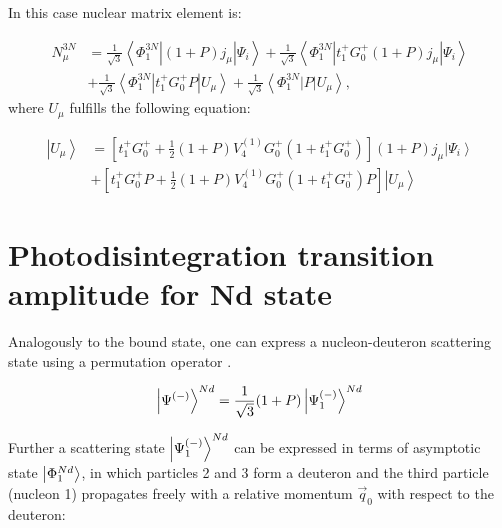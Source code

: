    In this case nuclear matrix element is:

    \begin{equation}
        \begin{aligned}
            N_\mu^{3 N} & =\frac{1}{\sqrt{3}}\left\langle\Phi_1^{3 N}\left|(1+P) j_\mu\right| \Psi_i\right\rangle+\frac{1}{\sqrt{3}}\left\langle\Phi_1^{3 N}\left|t_1^{+} G_0^{+}(1+P) j_\mu\right| \Psi_i\right\rangle \\
            & +\frac{1}{\sqrt{3}}\left\langle\Phi_1^{3 N}\left|t_1^{+} G_0^{+} P\right| U_\mu\right\rangle+\frac{1}{\sqrt{3}}\left\langle\Phi_1^{3 N}|P| U_\mu\right\rangle,
            \end{aligned}
        \label{3n_matrix}
    \end{equation}
    where $ U_\mu$ fulfills the
    following equation:

    \begin{equation}
        \begin{aligned}
            \left|U_\mu\right\rangle & =\left[t_1^{+} G_0^{+}+\frac{1}{2}(1+P) V_4^{(1)} G_0^{+}\left(1+t_1^{+} G_0^{+}\right)\right](1+P) j_\mu\left|\Psi_i\right\rangle \\
            & +\left[t_1^{+} G_0^{+} P+\frac{1}{2}(1+P) V_4^{(1)} G_0^{+}\left(1+t_1^{+} G_0^{+}\right) P\right]\left|U_\mu\right\rangle
            \end{aligned}
        \label{u_mu}
    \end{equation}



\section{Photodisintegration transition amplitude for Nd state}
\label{nd_state}

    Analogously to the bound state, one can express a nucleon-deuteron
    scattering state
    using a permutation operator .

    \begin{equation}
        \ket{\Psi^{(-)}}^{Nd} = \frac{1}{\sqrt{3}}(1+P)\ket{\Psi^{(-)}_1}^{Nd}    
    \end{equation}

    Further a scattering state $\ket{\Psi^{(-)}_1}^{Nd}$ can be expressed
    in terms of asymptotic state $\ket{\Phi^{Nd}_1}$, in which particles
    2 and 3 form a deuteron and the third particle (nucleon 1)
     propagates freely with a relative momentum $\vec{q}_0$ with 
    respect to the deuteron:

